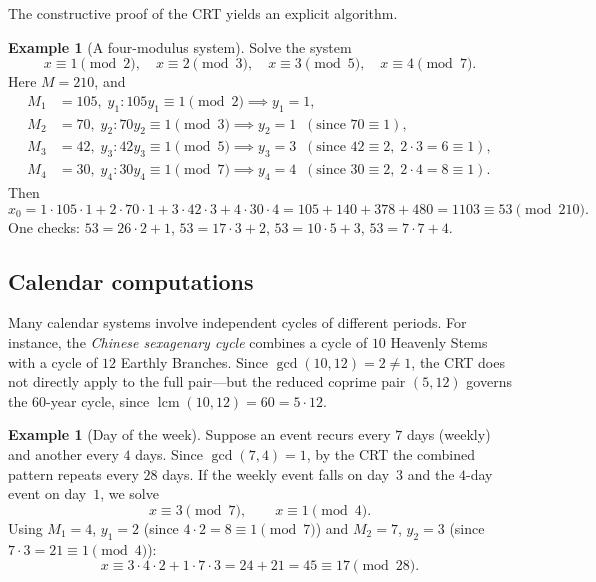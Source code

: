 \documentclass[12pt,a4paper,openany]{book}
\theoremstyle{definition}
\newtheorem{example}[definition]{Example}
\theoremstyle{plain}
\theoremstyle{remark}
\DeclareMathOperator{\lcm}{lcm}
\begin{document}
The constructive proof of the CRT yields an explicit algorithm.

\begin{example}[A four-modulus system]
\label{ex:crt-four-moduli}
Solve the system
\[
  x \equiv 1 \pmod{2}, \quad
  x \equiv 2 \pmod{3}, \quad
  x \equiv 3 \pmod{5}, \quad
  x \equiv 4 \pmod{7}.
\]
Here $M = 210$, and
\begin{align*}
  M_1 &= 105,\; y_1: 105 y_1 \equiv 1 \pmod{2} \implies y_1 = 1,\\
  M_2 &= 70,\; y_2: 70 y_2 \equiv 1 \pmod{3} \implies y_2 = 1 \;\;(\text{since } 70 \equiv 1),\\
  M_3 &= 42,\; y_3: 42 y_3 \equiv 1 \pmod{5} \implies y_3 = 3 \;\;(\text{since } 42 \equiv 2,\; 2\cdot 3 = 6 \equiv 1),\\
  M_4 &= 30,\; y_4: 30 y_4 \equiv 1 \pmod{7} \implies y_4 = 4 \;\;(\text{since } 30 \equiv 2,\; 2\cdot 4 = 8 \equiv 1).
\end{align*}
Then
\[
  x_0 = 1 \cdot 105 \cdot 1 + 2 \cdot 70 \cdot 1 + 3 \cdot 42 \cdot 3 + 4 \cdot 30 \cdot 4
      = 105 + 140 + 378 + 480 = 1103 \equiv 53 \pmod{210}.
\]
One checks: $53 = 26 \cdot 2 + 1$, $53 = 17 \cdot 3 + 2$, $53 = 10 \cdot 5 + 3$, $53 = 7 \cdot 7 + 4$.
\end{example}

\subsection{Calendar computations}
\label{subsec:crt-calendar}

Many calendar systems involve independent cycles of different periods.
For instance, the \emph{Chinese sexagenary cycle}
combines a cycle of $10$ Heavenly Stems with a cycle of $12$ Earthly Branches.
Since $\gcd(10, 12) = 2 \neq 1$, the CRT does not directly apply to the full
pair---but the reduced coprime pair $(5, 12)$ governs the $60$-year cycle,
since $\lcm(10, 12) = 60 = 5 \cdot 12$.

\begin{example}[Day of the week]
\label{ex:crt-weekday}
Suppose an event recurs every $7$ days (weekly) and another every $4$ days.
Since $\gcd(7,4) = 1$, by the CRT the combined pattern repeats every $28$ days.
If the weekly event falls on day~$3$ and the $4$-day event on day~$1$, we solve
\[
  x \equiv 3 \pmod{7}, \qquad x \equiv 1 \pmod{4}.
\]
Using $M_1 = 4$, $y_1 = 2$ (since $4 \cdot 2 = 8 \equiv 1 \pmod{7}$) and
$M_2 = 7$, $y_2 = 3$ (since $7 \cdot 3 = 21 \equiv 1 \pmod{4}$):
\[
  x \equiv 3 \cdot 4 \cdot 2 + 1 \cdot 7 \cdot 3 = 24 + 21 = 45 \equiv 17 \pmod{28}.
\]
\end{example}
\end{document}
